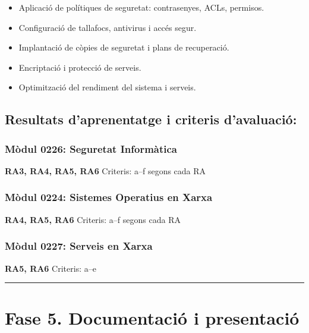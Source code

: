 \documentclass[
  a4paper,
]{article}
\providecommand{\tightlist}{%
  \setlength{\itemsep}{0pt}\setlength{\parskip}{0pt}}
\begin{document}
\begin{itemize}
\tightlist
\item
  Aplicació de polítiques de seguretat: contrasenyes, ACLs, permisos.
\item
  Configuració de tallafocs, antivirus i accés segur.
\item
  Implantació de còpies de seguretat i plans de recuperació.
\item
  Encriptació i protecció de serveis.
\item
  Optimització del rendiment del sistema i serveis.
\end{itemize}

\subsection{Resultats d'aprenentatge i criteris
d'avaluació:}\label{resultats-daprenentatge-i-criteris-davaluaciuxf3-3}

\subsubsection{Mòdul 0226: Seguretat
Informàtica}\label{muxf2dul-0226-seguretat-informuxe0tica-3}

\textbf{RA3, RA4, RA5, RA6} Criteris: a--f segons cada RA

\subsubsection{Mòdul 0224: Sistemes Operatius en
Xarxa}\label{muxf2dul-0224-sistemes-operatius-en-xarxa-3}

\textbf{RA4, RA5, RA6} Criteris: a--f segons cada RA

\subsubsection{Mòdul 0227: Serveis en
Xarxa}\label{muxf2dul-0227-serveis-en-xarxa-3}

\textbf{RA5, RA6} Criteris: a--e

\begin{center}\rule{0.5\linewidth}{0.5pt}\end{center}

\section{Fase 5. Documentació i
presentació}\label{fase-5.-documentaciuxf3-i-presentaciuxf3}
\end{document}
